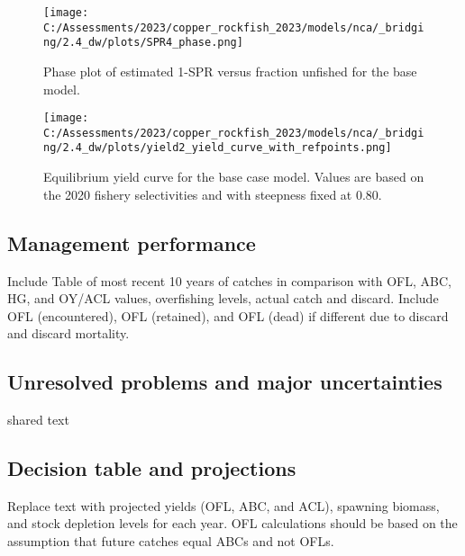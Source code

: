 \documentclass[11pt,
  english,
  letterpaper,
]{article}
\begin{document}
\begin{figure}
\centering
\texttt{[image: C:/Assessments/2023/copper\_rockfish\_2023/models/nca/\_bridging/2.4\_dw/plots/SPR4\_phase.png]}
\caption{Phase plot of estimated 1-SPR versus fraction unfished for the base model.\label{fig:es-phase}}
\end{figure}

\begin{figure}
\centering
\texttt{[image: C:/Assessments/2023/copper\_rockfish\_2023/models/nca/\_bridging/2.4\_dw/plots/yield2\_yield\_curve\_with\_refpoints.png]}
\caption{Equilibrium yield curve for the base case model. Values are based on the 2020 fishery selectivities and with steepness fixed at 0.80.\label{fig:es-yield}}
\end{figure}

\hypertarget{management-performance}{%
\subsection*{Management performance}\label{management-performance}}

Include Table of most recent 10 years of catches in comparison with OFL, ABC, HG, and OY/ACL values, overfishing levels, actual catch and discard. Include OFL (encountered), OFL (retained), and OFL (dead) if different due to discard and discard mortality.

\hypertarget{unresolved-problems-and-major-uncertainties}{%
\subsection*{Unresolved problems and major uncertainties}\label{unresolved-problems-and-major-uncertainties}}

shared text

\hypertarget{decision-table-and-projections}{%
\subsection*{Decision table and projections}\label{decision-table-and-projections}}

Replace text with projected yields (OFL, ABC, and ACL), spawning biomass, and stock depletion levels for each year. OFL calculations should be based on the assumption that future catches equal ABCs and not OFLs.
\end{document}
